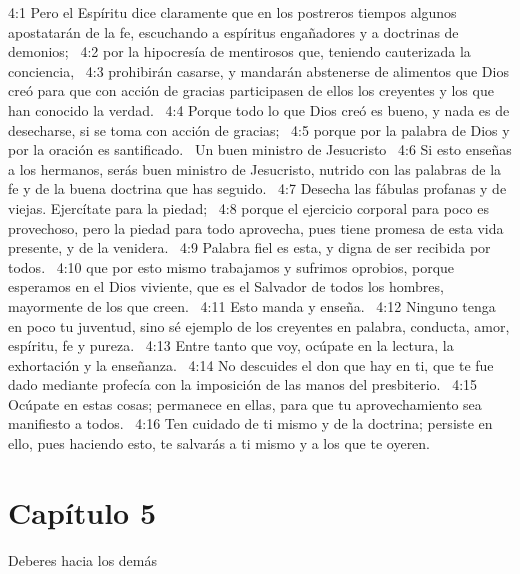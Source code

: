 4:1 Pero el Espíritu dice claramente que en los postreros tiempos algunos apostatarán de la fe, escuchando a espíritus engañadores y a doctrinas de demonios;  
4:2 por la hipocresía de mentirosos que, teniendo cauterizada la conciencia,  
4:3 prohibirán casarse, y mandarán abstenerse de alimentos que Dios creó para que con acción de gracias participasen de ellos los creyentes y los que han conocido la verdad.  
4:4 Porque todo lo que Dios creó es bueno, y nada es de desecharse, si se toma con acción de gracias;  
4:5 porque por la palabra de Dios y por la oración es santificado.  
Un buen ministro de Jesucristo  
4:6 Si esto enseñas a los hermanos, serás buen ministro de Jesucristo, nutrido con las palabras de la fe y de la buena doctrina que has seguido.  
4:7 Desecha las fábulas profanas y de viejas. Ejercítate para la piedad;  
4:8 porque el ejercicio corporal para poco es provechoso, pero la piedad para todo aprovecha, pues tiene promesa de esta vida presente, y de la venidera.  
4:9 Palabra fiel es esta, y digna de ser recibida por todos.  
4:10 que por esto mismo trabajamos y sufrimos oprobios, porque esperamos en el Dios viviente, que es el Salvador de todos los hombres, mayormente de los que creen.  
4:11 Esto manda y enseña.  
4:12 Ninguno tenga en poco tu juventud, sino sé ejemplo de los creyentes en palabra, conducta, amor, espíritu, fe y pureza.  
4:13 Entre tanto que voy, ocúpate en la lectura, la exhortación y la enseñanza.  
4:14 No descuides el don que hay en ti, que te fue dado mediante profecía con la imposición de las manos del presbiterio.  
4:15 Ocúpate en estas cosas; permanece en ellas, para que tu aprovechamiento sea manifiesto a todos.  
4:16 Ten cuidado de ti mismo y de la doctrina; persiste en ello, pues haciendo esto, te salvarás a ti mismo y a los que te oyeren.  
\section*{Capítulo 5}
Deberes hacia los demás  

